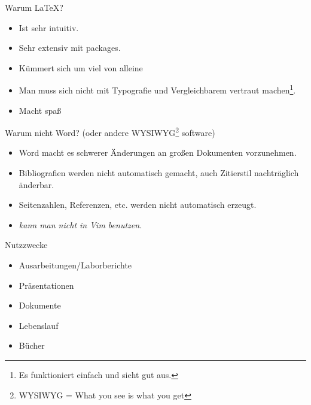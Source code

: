 \begin{frame}{Warum \LaTeX?}
    \begin{itemize}
        \item Ist sehr intuitiv.
        \item Sehr extensiv mit packages.
        \item K\"ummert sich um viel von alleine
        \item Man muss sich nicht mit Typografie und Vergleichbarem vertraut machen\footnote{Es funktioniert einfach und sieht gut aus.}.
        \item Macht spa\ss
    \end{itemize}
\end{frame}



\begin{frame}{Warum nicht Word? (oder andere WYSIWYG\footnote{WYSIWYG = What you see is what you get} software)}
    \begin{itemize}
        \item Word macht es schwerer \"Anderungen an gro\ss{}en Dokumenten vorzunehmen.
        \item Bibliografien werden nicht automatisch gemacht, auch Zitierstil nachtr\"aglich \"anderbar.
        \item Seitenzahlen, Referenzen, etc. werden nicht automatisch erzeugt.
        \item \textit{kann man nicht in Vim benutzen.}
    \end{itemize}
    
\end{frame}




\begin{frame}{Nutzzwecke}

    \begin{itemize}
        \item Ausarbeitungen/Laborberichte
        \item Pr\"asentationen
        \item Dokumente
        \item Lebenslauf
        \item B\"ucher
    \end{itemize}
\end{frame}





